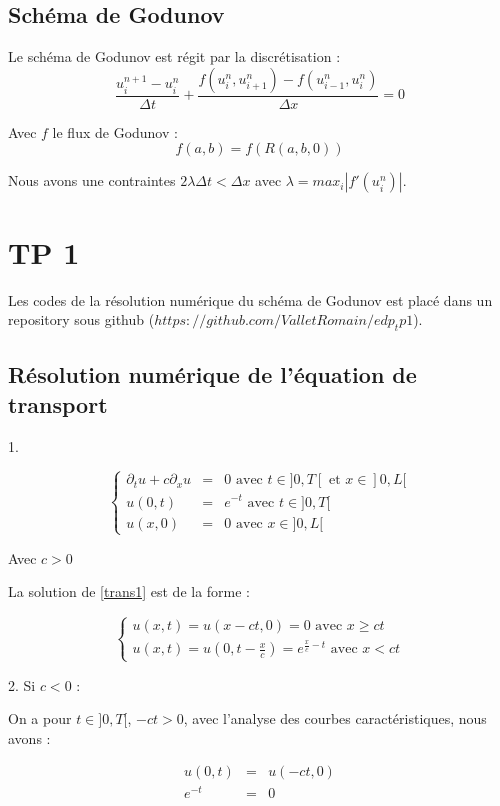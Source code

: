 \documentclass{article}
\begin{document}
\subsection{Schéma de Godunov}

Le schéma de Godunov est régit par la discrétisation :
\[ \frac{u_i^{n+1}-u_i^n}{\Delta t} + \frac{f(u_i^n,u_{i+1}^n) - f(u_{i-1}^n,u_i^n)}{\Delta x} = 0 \]

Avec $f$ le flux de Godunov :
\[f(a,b) = f(R(a,b,0))\]

Nous avons une contraintes $2\lambda \Delta t < \Delta x$ avec $\lambda = max_i |f'(u_i^n)|$.

\section{TP 1}

Les codes de la résolution numérique du schéma de Godunov est placé dans un repository sous github ($https://github.com/ValletRomain/edp_tp1$).

\subsection{Résolution numérique de l’équation de transport}

1.

\[ \left\{ \begin{matrix}
\partial_t u + c \partial_x u &=& 0 \text{ avec } t \in ]0,T[ \text{ et } x \in ]0,L[  \\
u(0,t) &=& e^{-t} \text{ avec } t \in ]0,T[ \\
u(x,0) &=& 0 \text{ avec } x \in ]0,L[
\end{matrix} \right.
\label{trans1} \tag{Transport1} \]

Avec $c>0$
\newline

La solution de \ref{trans1} est de la forme :

\[
\left\{
\begin{array}{ll}
    u(x,t) = u(x-ct,0) = 0 \text{ avec } x \geq ct \\
    u(x,t) = u(0,t-\frac{x}{c}) = e^{\frac{x}{c}-t} \text{ avec } x < ct
\end{array}
\right.
\tag{Sol1}
\]

2. Si $c < 0$ :

On a pour $t \in ]0,T[$, $-ct>0$, avec l'analyse des courbes caractéristiques, nous avons :

\begin{eqnarray*}
u(0,t) &=& u(-ct,0) \\
e^{-t} &=& 0
\end{eqnarray*}
\end{document}
